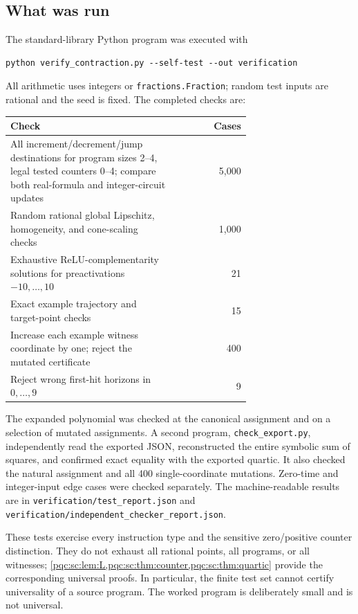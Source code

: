 \documentclass[11pt,letterpaper]{article}
\numberwithin{equation}{section}
\theoremstyle{definition}
\theoremstyle{remark}
\newcommand{\code}[1]{\nolinkurl{#1}}
\begin{document}
\subsection{What was run}

The standard-library Python program was executed with
\begin{lstlisting}
python verify_contraction.py --self-test --out verification
\end{lstlisting}
All arithmetic uses integers or \code{fractions.Fraction}; random test
inputs are rational and the seed is fixed. The completed checks are:
\begin{center}
\begin{tabular}{>{\raggedright\arraybackslash}p{0.69\linewidth}r}
\toprule
Check & Cases \\\midrule
All increment/decrement/jump destinations for program sizes 2--4,
legal tested counters 0--4; compare both real-formula and integer-circuit updates & 5,000\\
Random rational global Lipschitz, homogeneity, and cone-scaling checks & 1,000\\
Exhaustive ReLU-complementarity solutions for preactivations $-10,\ldots,10$ & 21\\
Exact example trajectory and target-point checks & 15\\
Increase each example witness coordinate by one; reject the mutated certificate & 400\\
Reject wrong first-hit horizons in $0,\ldots,9$ & 9\\
\bottomrule
\end{tabular}
\end{center}
The expanded polynomial was checked at the canonical assignment and on a
selection of mutated assignments. A second program, \code{check_export.py},
independently read the exported JSON, reconstructed the entire symbolic
sum of squares, and confirmed exact equality with the exported quartic.
It also checked the natural assignment and all 400 single-coordinate
mutations. Zero-time and integer-input edge cases were checked separately.
The machine-readable results are in
\code{verification/test_report.json} and
\code{verification/independent_checker_report.json}.

These tests exercise every instruction type and the sensitive zero/positive
counter distinction. They do not exhaust all rational points, all programs,
or all witnesses; \cref{pqc:sc:lem:L,pqc:sc:thm:counter,pqc:sc:thm:quartic} provide the corresponding
universal proofs. In particular, the finite test set cannot certify
universality of a source program. The worked program is deliberately small
and is not universal.
\end{document}
